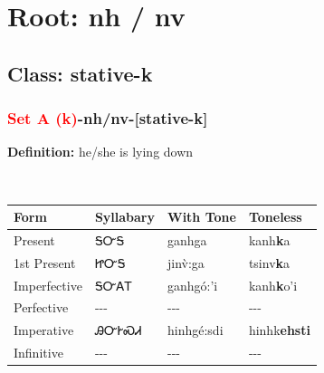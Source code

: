 \needspace{4in}
\section*{Root: nh / nv}
\nopagebreak
{}
\needspace{3in}
\subsection*{Class: stative-k}
\nopagebreak
\needspace{2in}
\subsubsection*{\textcolor{Red}{Set A (k)}{-}\textbf{nh/nv}{-}[stative-k]}
\nopagebreak
\textbf{Definition: } he/she is lying down
\\[0.5em]
\begin{tabularx}{\textwidth}{l X X X}%
\toprule%
\textbf{Form}&\textbf{Syllabary}&\textbf{With Tone}&\textbf{Toneless}\\%
\midrule%
Present&ᎦᏅᎦ&ganhga&kanh\textbf{k}a\\%
1st Present&ᏥᏅᎦ&jinv̀:ga&tsinv\textbf{k}a\\%
Imperfective&ᎦᏅᎪᎢ&ganhgó:’i&kanh\textbf{k}o'i\\%
Perfective&{-}{-}{-}&{-}{-}{-}&{-}{-}{-}\\%
Imperative&ᎯᏅᎨᏍᏗ&hinhgé:sdi&hinhk\textbf{ehsti}\\%
Infinitive&{-}{-}{-}&{-}{-}{-}&{-}{-}{-}\\%
\bottomrule%
\end{tabularx}
\\[1em]